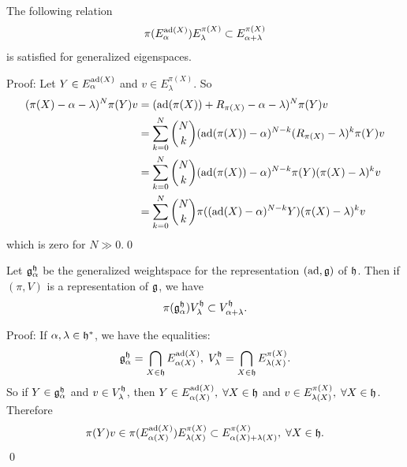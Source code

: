 \begin{dang}
    \begin{lemma}
     The following relation  
     \begin{equation}
        \pi(E_{\alpha}^{\text{ad}(X)}) E_\lambda^{\pi(X)}\subset E_{\alpha+\lambda}^{\pi(X)}
     \end{equation}
     is satisfied for generalized eigenspaces.
    \end{lemma}
\end{dang}
Proof: Let $Y\in E_{\alpha}^{\text{ad}(X)}$ and $v\in E_\lambda^{\pi(X)}$. So
\begin{equation}
    \begin{split}
        (\pi(X)-\alpha-\lambda)^N\pi(Y)v&=(\text{ad}(\pi(X))+R_{\pi(X)}-\alpha-\lambda)^N\pi(Y)v\\
        &=\sum_{k=0}^N\binom{N}{k}(\text{ad}(\pi(X))-\alpha)^{N-k}(R_{\pi(X)}-\lambda)^k\pi(Y)v\\
        &=\sum_{k=0}^N\binom{N}{k}(\text{ad}(\pi(X))-\alpha)^{N-k}\pi(Y)(\pi(X)-\lambda)^kv\\
        &=\sum_{k=0}^N\binom{N}{k}\pi ((\text{ad}(X)-\alpha)^{N-k}Y)(\pi(X)-\lambda)^kv
    \end{split}
\end{equation}
which is zero for $N\gg0$.\qed


\begin{dang}
    \begin{lemma}
        Let $\mathfrak{g}_\alpha^{\mathfrak{h}}$ be the generalized weightspace for the representation $(\text{ad},\mathfrak{g})$ of $\mathfrak{h}$. 
        Then if $(\pi,V)$ is a representation of $\mathfrak{g}$, we have 
        \begin{equation}
            \pi(\mathfrak{g}_\alpha^{\mathfrak{h}})V_\lambda^{\mathfrak{h}}\subset V_{\alpha+\lambda}^{\mathfrak{h}}.
        \end{equation}
    \end{lemma}
\end{dang}
Proof: If $\alpha,\lambda\in\mathfrak{h}^*$, we have the equalities: 
\begin{equation}
   \mathfrak{g}_\alpha^{\mathfrak{h}}=\bigcap_{X\in\mathfrak{h}}E_{\alpha(X)}^{\text{ad}(X)},\; V_{\lambda}^{\mathfrak{h}}=\bigcap_{X\in\mathfrak{h}}E_{\lambda(X)}^{\pi(X)}.
\end{equation}
So if $Y\in \mathfrak{g}_\alpha^{\mathfrak{h}}$ and $v\in V_{\lambda}^{\mathfrak{h}}$, then $Y\in E_{\alpha(X)}^{\text{ad}(X)},\;\forall X\in\mathfrak{h}$ 
and $v\in E_{\lambda(X)}^{\pi(X)},\;\forall X\in\mathfrak{h}$. Therefore
\begin{equation}
    \pi(Y)v\in \pi(E_{\alpha(X)}^{\text{ad}(X)})E_{\lambda(X)}^{\pi(X)}\subset E_{\alpha(X)+\lambda(X)}^{\pi(X)},\;\forall X\in\mathfrak{h}.
\end{equation}
\qed


